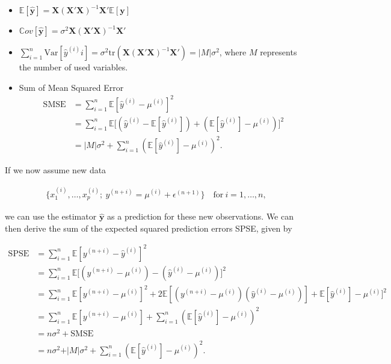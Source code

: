 \documentclass[10pt,a4paper]{article}
\begin{document}
\begin{itemize}
	\item $\mathbb{E} [\boldsymbol{\hat{y}}] = \boldsymbol{X}(\boldsymbol{X}'\boldsymbol{X})^{-1}\boldsymbol{X}'\mathbb{E}[\boldsymbol{y}]$
	\item $\mathbb Cov[\boldsymbol{\hat{y}}] = \sigma^2 \boldsymbol{X}(\boldsymbol{X}'\boldsymbol{X})^{-1}\boldsymbol{X}'$
	\item $\sum_{i=1}^n \text{Var} [\hat y^{(i)}i] = \sigma^2 \text{tr}(\boldsymbol{X}(\boldsymbol{X}'\boldsymbol{X})^{-1}\boldsymbol{X}') = \vert M \vert \sigma^2$, where $M$ represents the number  of used variables.
	\item Sum of Mean Squared Error
		\begin{equation}  
		\begin{split} 
		\text{SMSE} &= \sum_{i=1}^n \mathbb{E}[\hat y^{(i)} - \mu^{(i)}]^2 \\
				    &= \sum_{i=1}^n \mathbb{E}\big[(\hat y^{(i)} - \mathbb{E}[\hat y^{(i)}]) + (\mathbb{E}[\hat y^{(i)}] - \mu^{(i)}) \big]^2 \\
				    &= \vert M \vert\sigma^2 + \sum_{i=1}^n(\mathbb{E}[\hat y^{(i)}] - \mu^{(i)})^2.
		\end{split}
		\end{equation}
\end{itemize}

If we now assume new data 

\begin{align} \label{eq:new_data}
	\{ x^{(i)}_{1}, \dots, x^{(i)}_{p}; \ y^{(n+i)} = \mu^{(i)} + \epsilon^{(n+1)}\} \quad \text{for} \ i = 1, \dots, n,
\end{align}

we can use the estimator $\boldsymbol{\hat{y}}$ as a prediction for these new observations. We can then derive the sum of the expected squared prediction errors SPSE, given by

\begin{equation}
\begin{split}
	\text{SPSE} &= \sum_{i=1}^{n} \mathbb{E}[y^{(n+i)} - \hat y^{(i)}]^2 \\ 
				&= \sum_{i=1}^{n} \mathbb{E}\big[(y^{(n+i)} - \mu^{(i)}) - (\hat y^{(i)} - \mu^{(i)})\big]^2 \\ 
				&= \sum_{i=1}^{n} \mathbb{E}[y^{(n+i)} - \mu^{(i)}]^2 + 2\mathbb{E}[(y^{(n+i)} - \mu^{(i)})(\hat y^{(i)} - \mu^{(i)})] + \mathbb{E}[\hat y^{(i)}] - \mu^{(i)}]^2 \\
				&= \sum_{i=1}^{n}\mathbb{E}[y^{(n+i)} - \mu^{(i)}] + \sum_{i=1}^{n}(\mathbb{E}[\hat y^{(i)}] - \mu^{(i)})^2 \\ 
				&= n\sigma^2 + \text{SMSE} \\ 
				&= n\sigma^2 + \vert M \vert \sigma^2 + \sum_{i=1}^{n}(\mathbb{E}[\hat y^{(i)}] - \mu^{(i)})^2.
\end{split}
\end{equation}
\end{document}
